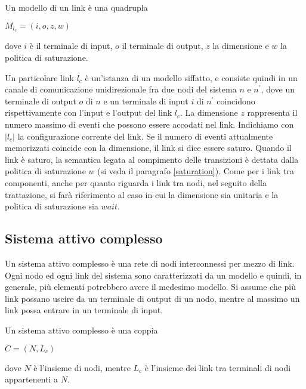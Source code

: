 \begin{defn}
Un modello di un link è una quadrupla
\begin{center}
	$M_{l_c} = (i,o,z,w)$
\end{center}
dove $i$ è il terminale di input, $o$ il terminale di output, $z$ la dimensione e $w$ la politica di saturazione.
\end{defn}
Un particolare link $l_c$ è un'istanza di un modello siffatto, e consiste quindi in un canale di comunicazione unidirezionale fra due nodi del sistema $n$ e $n^\prime$, dove un terminale di output $o$ di $n$ e un terminale di input $i$ di $n^\prime$ coincidono rispettivamente con l'input e l'output del link $l_c$.
La dimensione $z$ rappresenta il numero massimo di eventi che possono essere accodati nel link. 
Indichiamo con $|l_c|$ la configurazione corrente del link. 
Se il numero di eventi attualmente memorizzati coincide con la dimensione, il link si dice essere saturo.
Quando il link è saturo, la semantica legata al compimento delle transizioni è dettata dalla politica di saturazione $w$ (si veda il paragrafo \ref{saturation}).
Come per i link tra componenti, anche per quanto riguarda i link tra nodi, nel seguito della trattazione, si farà riferimento al caso in cui la dimensione sia unitaria e la politica di saturazione sia $wait$.

\subsection{Sistema attivo complesso}
Un sistema attivo complesso è una rete di nodi interconnessi per mezzo di link. Ogni nodo ed ogni link del sistema sono caratterizzati da un modello e quindi, in generale, più elementi potrebbero avere il medesimo modello. Si assume che più link possano uscire da un terminale di output di un nodo, mentre al massimo un link possa entrare in un terminale di input.

\begin{defn}
Un sistema attivo complesso è una coppia
\begin{center}
	$ C = (N,L_c)$
\end{center}
dove $N$ è l'insieme di nodi, mentre $L_c$ è l'insieme dei link tra terminali di nodi appartenenti a $N$.
\end{defn}


